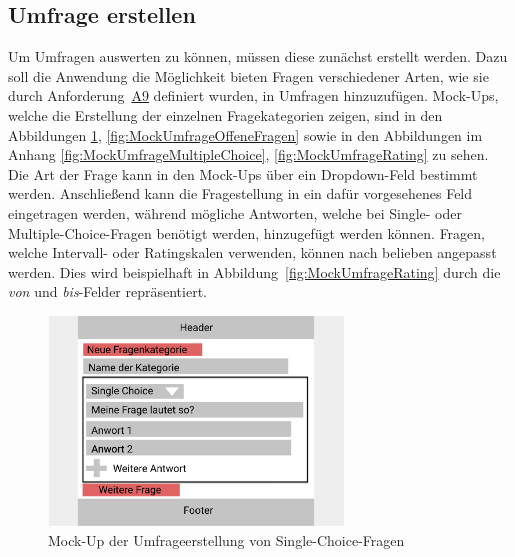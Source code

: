 \subsection{Umfrage erstellen}
\label{ssec:konzept:client:umfrage_erstellen}

Um Umfragen auswerten zu können, müssen diese zunächst erstellt werden.
Dazu soll die Anwendung die Möglichkeit bieten Fragen verschiedener Arten, wie sie durch Anforderung~\hyperref[Anf:A9]{A9} definiert wurden, in Umfragen hinzuzufügen.
Mock-Ups, welche die Erstellung der einzelnen Fragekategorien zeigen, sind in den Abbildungen \ref{fig:MockUmfrageSingleChoice}, \ref{fig:MockUmfrageOffeneFragen} sowie in den Abbildungen im Anhang \ref{fig:MockUmfrageMultipleChoice}, \ref{fig:MockUmfrageRating} zu sehen.
Die Art der Frage kann in den Mock-Ups über ein Dropdown-Feld bestimmt werden.
Anschließend kann die Fragestellung in ein dafür vorgesehenes Feld eingetragen werden, während mögliche Antworten, welche bei Single- oder Multiple-Choice-Fragen benötigt werden, hinzugefügt werden können.
Fragen, welche Intervall- oder Ratingskalen verwenden, können nach belieben angepasst werden.
Dies wird beispielhaft in Abbildung~\ref{fig:MockUmfrageRating} durch die \emph{von} und \emph{bis}-Felder repräsentiert.

\begin{figure}[H]
	\centering
	\includegraphics[width=0.7\textwidth]{img/konzeption/client/umfrage_erstellen_single_choice}
	\captionsetup{justification=centering, format=plain}
	\caption[Mock-Up der Umfrageerstellung von Single-Choice-Fragen]{Mock-Up der Umfrageerstellung von Single-Choice-Fragen\\\figma}
	\label{fig:MockUmfrageSingleChoice}
\end{figure}


